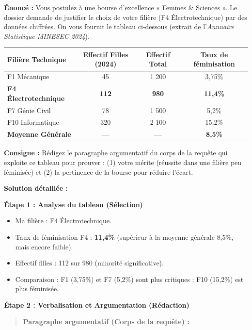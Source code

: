 \documentclass[11pt]{article}
\begin{document}
\begin{exoresolu}
\textbf{Énoncé :} Vous postulez à une bourse d'excellence « Femmes \& Sciences ». Le dossier demande de justifier le choix de votre filière (F4 Électrotechnique) par des données chiffrées. On vous fournit le tableau ci-dessous (extrait de l'\emph{Annuaire Statistique MINESEC 2024}).

\begin{center}
\begin{tabular}{|l|c|c|c|}\hline
\textbf{Filière Technique} & \textbf{Effectif Filles (2024)} & \textbf{Effectif Total} & \textbf{Taux de féminisation} \\ \hline
F1 Mécanique & 45 & 1 200 & 3,75\% \\ \hline
\textbf{F4 Électrotechnique} & \textbf{112} & \textbf{980} & \textbf{11,4\%} \\ \hline
F7 Génie Civil & 78 & 1 500 & 5,2\% \\ \hline
F10 Informatique & 320 & 2 100 & 15,2\% \\ \hline
\textbf{Moyenne Générale} & \textbf{---} & \textbf{---} & \textbf{8,5\%} \\ \hline
\end{tabular}
\end{center}

\textbf{Consigne :} Rédigez le paragraphe argumentatif du corps de la requête qui exploite ce tableau pour prouver : (1) votre mérite (réussite dans une filière peu féminisée) et (2) la pertinence de la bourse pour réduire l'écart.

\tcblower
\textbf{Solution détaillée :}

\textbf{Étape 1 : Analyse du tableau (Sélection)}
\begin{itemize}
    \item Ma filière : F4 Électrotechnique.
    \item Taux de féminisation F4 : \textbf{11,4\%} (supérieur à la moyenne générale 8,5\%, mais encore faible).
    \item Effectif filles : 112 sur 980 (minorité significative).
    \item Comparaison : F1 (3,75\%) et F7 (5,2\%) sont plus critiques ; F10 (15,2\%) est plus féminisée.
\end{itemize}

\textbf{Étape 2 : Verbalisation et Argumentation (Rédaction)}

\begin{quote}
\textbf{Paragraphe argumentatif (Corps de la requête) :}


\end{quote}
\end{exoresolu}
\end{document}
